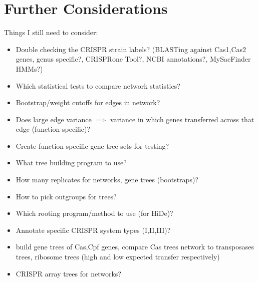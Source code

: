 \documentclass[12pt,letter]{article}
\begin{document}
\section*{Further Considerations}
Things I still need to consider:
    \begin{itemize}
        \item Double checking the CRISPR strain labels? (BLASTing against Cas1,Cas2 genes, genus specific?, CRISPRone Tool?, NCBI annotations?, MySacFinder HMMs?)
        \item Which statistical tests to compare network statistics?
        \item Bootstrap/weight cutoffs for edges in network?
        \item Does large edge variance $\implies$ variance in which genes transferred across that edge (function specific)?
        \item Create function specific gene tree sets for testing?
        \item What tree building program to use?
        \item How many replicates for networks, gene trees (bootstraps)?
        \item How to pick outgroups for trees?
        \item Which rooting program/method to use (for HiDe)?
        \item Annotate specific CRISPR system types (I,II,III)?
        \item build gene trees of Cas,Cpf genes, compare Cas trees network to transposases trees, ribosome trees (high and low expected transfer respectively)
        \item CRISPR array trees for networks?
    \end{itemize}
\end{document}
